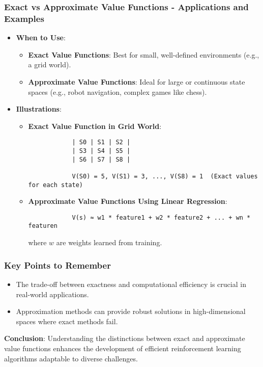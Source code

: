 \documentclass[aspectratio=169]{beamer}
\begin{document}
\begin{frame}[fragile]
    \frametitle{Exact vs Approximate Value Functions - Applications and Examples}
    \begin{itemize}
        \item \textbf{When to Use}:
        \begin{itemize}
            \item \textbf{Exact Value Functions}: 
            Best for small, well-defined environments (e.g., a grid world).
            
            \item \textbf{Approximate Value Functions}: 
            Ideal for large or continuous state spaces (e.g., robot navigation, complex games like chess).
        \end{itemize}
        
        \item \textbf{Illustrations}:
        \begin{itemize}
            \item \textbf{Exact Value Function in Grid World}:
            \begin{lstlisting}
            | S0 | S1 | S2 |
            | S3 | S4 | S5 |
            | S6 | S7 | S8 |

            V(S0) = 5, V(S1) = 3, ..., V(S8) = 1  (Exact values for each state)
            \end{lstlisting} 

            \item \textbf{Approximate Value Functions Using Linear Regression}:
            \begin{lstlisting}
            V(s) ≈ w1 * feature1 + w2 * feature2 + ... + wn * featuren
            \end{lstlisting} 
            where \( w \) are weights learned from training.
        \end{itemize}
    \end{itemize}
\end{frame}

\begin{frame}[fragile]
    \frametitle{Key Points to Remember}
    \begin{itemize}
        \item The trade-off between exactness and computational efficiency is crucial in real-world applications.
        \item Approximation methods can provide robust solutions in high-dimensional spaces where exact methods fail.
    \end{itemize}
    
    \textbf{Conclusion}: Understanding the distinctions between exact and approximate value functions enhances the development of efficient reinforcement learning algorithms adaptable to diverse challenges.
\end{frame}
\end{document}
